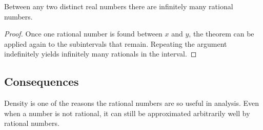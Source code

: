 \begin{corollary}
\label{cor:infinitely-many-rationals-between}
Between any two distinct real numbers there are infinitely many rational numbers.
\end{corollary}

\begin{proof}
Once one rational number is found between $x$ and $y$, the theorem can be applied again to the
subintervals that remain.  Repeating the argument indefinitely yields infinitely many rationals in the
interval.
\end{proof}

\subsection{Consequences}

\begin{remark}
Density is one of the reasons the rational numbers are so useful in analysis.  Even when a number is
not rational, it can still be approximated arbitrarily well by rational numbers.
\end{remark}

